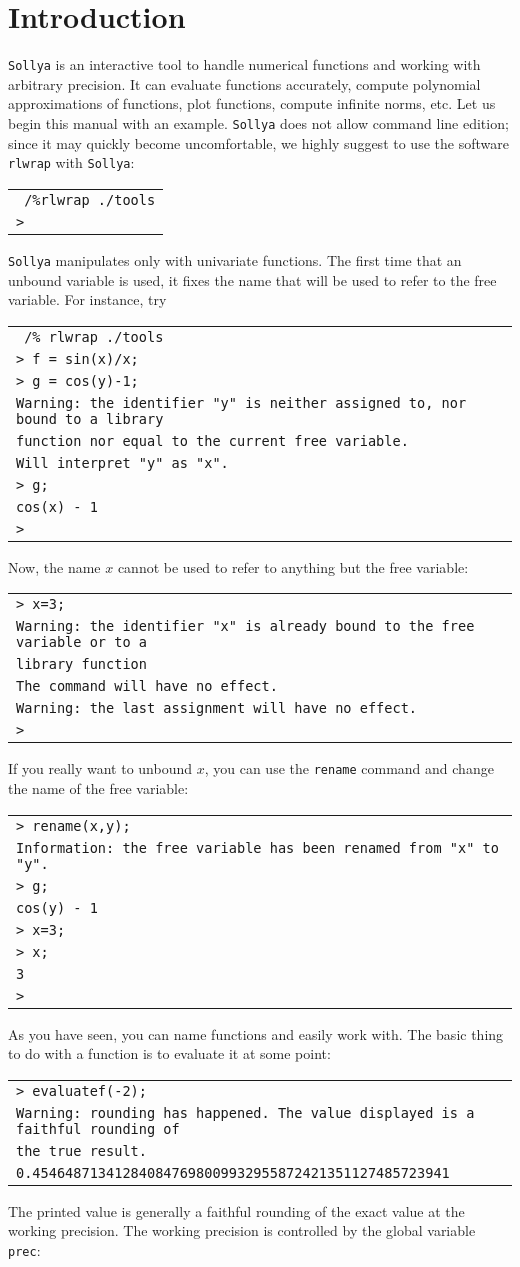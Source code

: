 \documentclass[a4paper]{article}
\newcommand{\com}[1]{\texttt{#1}}
\newcommand{\sollya}{\texttt{Sollya}\xspace}
\newcommand{\rlwrap}{\texttt{rlwrap}\xspace}
\newcommand{\code}[1]{
\begin{center}
\begin{tabular}{|p{14.8cm}|}
\hline
#1
\hline
\end{tabular}
\end{center}
}
\newcommand{\ligne}[1]{\texttt{#1}\\}
\begin{document}
\section{Introduction}
\sollya is an interactive tool to handle numerical functions and working with arbitrary precision. It can evaluate functions accurately, compute polynomial approximations of functions, plot functions, compute infinite norms, etc. Let us begin this manual with an example. \sollya does not allow command line edition; since it may quickly become uncomfortable, we highly suggest to use the software \rlwrap with \sollya:

\code{
\ligne{~/\%rlwrap ./tools}
\ligne{>}
}

\sollya manipulates only with univariate functions. The first time that an unbound variable is used, it fixes the name that will be used to refer to the free variable. For instance, try

\code{
\ligne{~/\% rlwrap ./tools}
\ligne{> f = sin(x)/x;}
\ligne{> g = cos(y)-1;}
\ligne{Warning: the identifier "y" is neither assigned to, nor bound to a library }
\ligne{function nor equal to the current free variable.}
\ligne{Will interpret "y" as "x".}
\ligne{> g;}
\ligne{cos(x) - 1}
\ligne{>} 
}

Now, the name $x$ cannot be used to refer to anything but the free variable:

\code{
\ligne{> x=3;}
\ligne{Warning: the identifier "x" is already bound to the free variable or to a }
\ligne{library function}
\ligne{The command will have no effect.}
\ligne{Warning: the last assignment will have no effect.}
\ligne{>}
}

If you really want to unbound $x$, you can use the \com{rename} command and change the name of the free variable:

\code{
\ligne{> rename(x,y);}
\ligne{Information: the free variable has been renamed from "x" to "y".}
\ligne{> g;}
\ligne{cos(y) - 1}
\ligne{> x=3;}
\ligne{> x;}
\ligne{3}
\ligne{> }
}

As you have seen, you can name functions and easily work with. The basic thing to do with a function is to evaluate it at some point:

\code{
\ligne{> evaluatef(-2);}
\ligne{Warning: rounding has happened. The value displayed is a faithful rounding of }
\ligne{the true result.}
\ligne{0.454648713412840847698009932955872421351127485723941}
}

The printed value is generally a faithful rounding of the exact value at the working precision. The working precision is controlled by the global variable \com{prec}:
\end{document}
